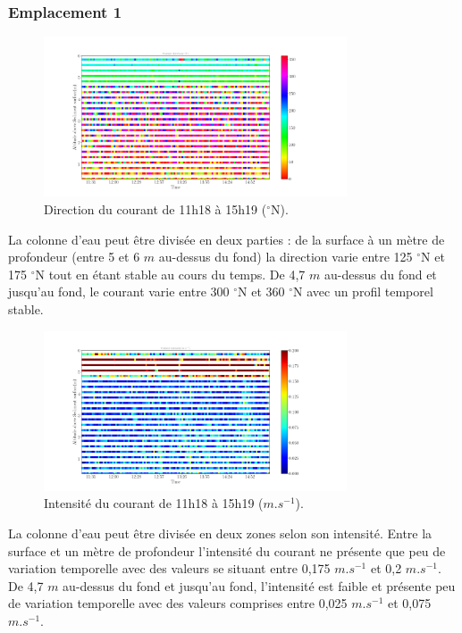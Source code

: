 \documentclass[12pt]{article}
\begin{document}
\subsubsection{Emplacement 1}

\begin{figure}[!ht]
	\begin{center}
	\includegraphics[width=0.8\textwidth]{180321021scatterdirection.png}
	\caption{Direction du courant de 11h18 à 15h19 ($^{\circ}$N).}
	\end{center}
\end{figure}
La colonne d'eau peut être divisée en deux parties : de la surface à un mètre de profondeur (entre 5 et 6 $m$ au-dessus du fond) la direction varie entre 125 $^{\circ}$N et 175 $^{\circ}$N tout en étant stable au cours du temps.
De 4,7 $m$ au-dessus du fond et jusqu'au fond, le courant varie entre 300 $^{\circ}$N et 360 $^{\circ}$N avec un profil temporel stable.\\

\begin{figure}[!ht]
	\begin{center}
		\includegraphics[width=0.8\textwidth]{180321021scatterintensity.png}
		\caption{Intensité du courant de 11h18 à 15h19 ($m.s^{-1}$).}
	\end{center}
\end{figure}
La colonne d'eau peut être divisée en deux zones selon son intensité. Entre la surface et un mètre de profondeur l'intensité du courant ne présente que peu de variation temporelle avec des valeurs se situant entre 0,175 $m.s^{-1}$ et 0,2 $m.s^{-1}$. De 4,7 $m$ au-dessus du fond et jusqu'au fond, l'intensité est faible et présente peu de variation temporelle avec des valeurs comprises entre 0,025 $m.s^{-1}$ et 0,075 $m.s^{-1}$.\\
\end{document}
